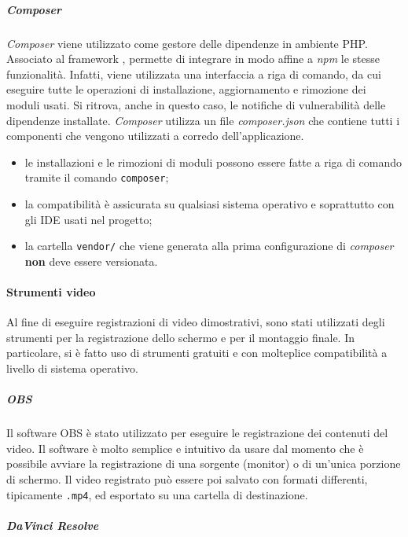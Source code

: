 	\subparagraph{Composer}

	\textit{Composer} viene utilizzato come gestore delle dipendenze in ambiente PHP. Associato al framework , permette di integrare in modo affine a \textit{npm} le stesse funzionalità. Infatti, viene utilizzata una interfaccia a riga di comando, da cui eseguire tutte le operazioni di installazione, aggiornamento e rimozione dei moduli usati. Si ritrova, anche in questo caso, le notifiche di vulnerabilità delle dipendenze installate.
	\textit{Composer} utilizza un file \textit{composer.json} che contiene tutti i componenti che vengono utilizzati a corredo dell'applicazione. 
	\begin{itemize}
		\item le installazioni e le rimozioni di moduli possono essere fatte a riga di comando tramite il comando \verb!composer!;
		\item la compatibilità è assicurata su qualsiasi sistema operativo e soprattutto con gli IDE usati nel progetto;
		\item la cartella \verb!vendor/! che viene generata alla prima configurazione di \textit{composer} \textbf{non} deve essere versionata.
	\end{itemize}


	\paragraph{Strumenti video}

	Al fine di eseguire registrazioni di video dimostrativi, sono stati utilizzati degli strumenti per la registrazione dello schermo e per il montaggio finale. In particolare, si è fatto uso di strumenti gratuiti e con molteplice compatibilità a livello di sistema operativo.

		\subparagraph{OBS}

		Il software OBS è stato utilizzato per eseguire le registrazione dei contenuti del video. Il software è molto semplice e intuitivo da usare dal momento che è possibile avviare la registrazione di una sorgente (monitor) o di un'unica porzione di schermo. Il video registrato può essere poi salvato con formati differenti, tipicamente \verb!.mp4!, ed esportato su una cartella di destinazione. 

		\subparagraph{DaVinci Resolve}

